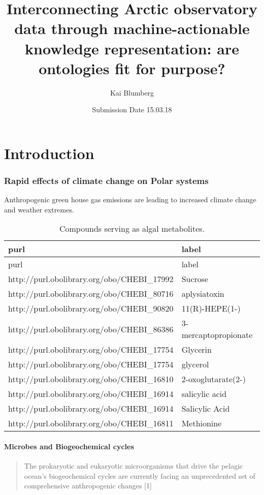 \documentclass[]{article}
\title{Interconnecting Arctic observatory data through machine-actionable
knowledge representation: are ontologies fit for purpose?}
\author{Kai Blumberg}
\date{Submission Date 15.03.18}
\let\oldparagraph\paragraph
\renewcommand{\paragraph}[1]{\oldparagraph{#1}\mbox{}}
\begin{document}
\maketitle

{
\hypersetup{linkcolor=}
\setcounter{tocdepth}{3}
\tableofcontents
}
\hypertarget{introduction}{%
\section{Introduction}\label{introduction}}

\hypertarget{rapid-effects-of-climate-change-on-polar-systems}{%
\subsubsection{Rapid effects of climate change on Polar
systems}\label{rapid-effects-of-climate-change-on-polar-systems}}

Anthropogenic green house gas emissions are leading to increased climate
change and weather extremes.

\begin{longtable}[]{@{}ll@{}}
\caption{Compounds serving as algal metabolites.}\tabularnewline
\toprule
purl & label\tabularnewline
\midrule
\endfirsthead
\toprule
purl & label\tabularnewline
\midrule
\endhead
http://purl.obolibrary.org/obo/CHEBI\_17992 & Sucrose\tabularnewline
http://purl.obolibrary.org/obo/CHEBI\_80716 &
aplysiatoxin\tabularnewline
http://purl.obolibrary.org/obo/CHEBI\_90820 &
11(R)-HEPE(1-)\tabularnewline
http://purl.obolibrary.org/obo/CHEBI\_86386 &
3-mercaptopropionate\tabularnewline
http://purl.obolibrary.org/obo/CHEBI\_17754 & Glycerin\tabularnewline
http://purl.obolibrary.org/obo/CHEBI\_17754 & glycerol\tabularnewline
http://purl.obolibrary.org/obo/CHEBI\_16810 &
2-oxoglutarate(2-)\tabularnewline
http://purl.obolibrary.org/obo/CHEBI\_16914 & salicylic
acid\tabularnewline
http://purl.obolibrary.org/obo/CHEBI\_16914 & Salicylic
Acid\tabularnewline
http://purl.obolibrary.org/obo/CHEBI\_16811 & Methionine\tabularnewline
\bottomrule
\end{longtable}

\hypertarget{microbes-and-biogeochemical-cycles}{%
\paragraph{Microbes and Biogeochemical
cycles}\label{microbes-and-biogeochemical-cycles}}

\begin{quote}
The prokaryotic and eukaryotic microorganisms that drive the pelagic
ocean's biogeochemical cycles are currently facing an unprecedented set
of comprehensive anthropogenic changes {[}1{]}
\end{quote}
\end{document}

